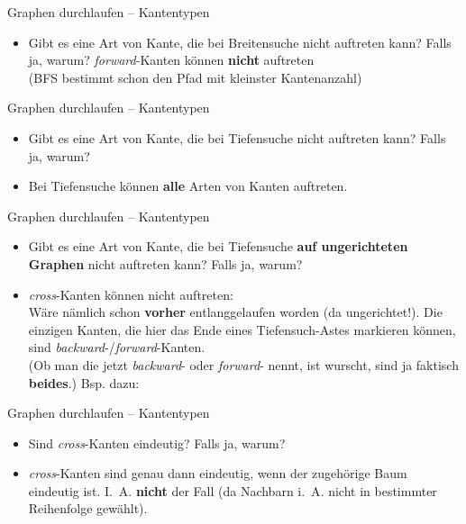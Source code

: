 \begin{frame}{Graphen durchlaufen – Kantentypen}
	\begin{itemize}
		\item Gibt es eine Art von Kante, die bei Breitensuche nicht auftreten kann? Falls ja, warum?
		\pause
		\implitem \textit{forward}-Kanten können \textbf{nicht} auftreten \\
		(BFS bestimmt schon den Pfad mit kleinster Kantenanzahl)
	\end{itemize}
\end{frame}

\begin{frame}{Graphen durchlaufen – Kantentypen}
	\begin{itemize}
		\item Gibt es eine Art von Kante, die bei Tiefensuche nicht auftreten kann? Falls ja, warum?
		\pause
		\item Bei Tiefensuche können \textbf{alle} Arten von Kanten auftreten.
	\end{itemize}
\end{frame}

\begin{frame}{Graphen durchlaufen – Kantentypen}
	\begin{itemize}
		\item Gibt es eine Art von Kante, die bei Tiefensuche \textbf{auf ungerichteten Graphen} nicht auftreten kann? Falls ja, warum?
		\pause
		\item \emph{cross}-Kanten können nicht auftreten: \\
		Wäre nämlich schon \textbf{vorher} entlanggelaufen worden (da ungerichtet!). Die einzigen Kanten, die hier das Ende eines Tiefensuch-Astes markieren können, sind \emph{backward}-/\emph{forward}-Kanten. \\
		(Ob man die jetzt \emph{backward}- oder \emph{forward}- nennt, ist wurscht, sind ja faktisch \textbf{beides}.) Bsp. dazu:
	\end{itemize}
	\centering
\end{frame}

\begin{frame}{Graphen durchlaufen – Kantentypen}
	\begin{itemize}
		\item Sind \emph{cross}-Kanten eindeutig? Falls ja, warum?
		\pause
		\item \emph{cross}-Kanten sind genau dann eindeutig, wenn der zugehörige Baum eindeutig ist. \impl I.~A. \textbf{nicht} der Fall (da Nachbarn i.~A. nicht in bestimmter Reihenfolge gewählt).
	\end{itemize}
\end{frame}

